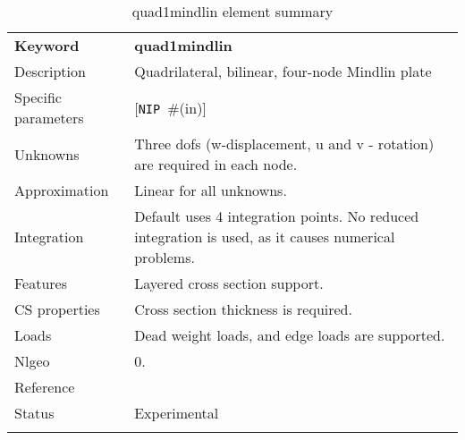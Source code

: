\documentclass[a4paper]{article}
\newcommand{\param}[1]{\texttt{#1}} %
\newcommand{\optional}[1]{[#1]} %
\newcommand{\field}[2]{\param{#1}~\#{\tiny(#2)}} %
\newcommand{\optField}[2]{\optional{\field{#1}{#2}}}
\newcommand{\templabel}{}%
\newcommand{\tempcaption}{}%
\newcounter{nelpar}
\newenvironment{elementsummary}[5]{%
  \gdef\tempcaption{#4}%
  \gdef\templabel{#5}%
  \setcounter{nelpar}{0}%
  \begin{center} %
    \begin{table}[!htb] %
      \begin{tabular}{|l|p{9cm}|}\hline %
        {\bf Keyword} & \bf{#1}\\ %
        {Description} & {#2}\\ %
        {Specific parameters} & {#3}\\ \hline %
}{
  \\ \hline %
      \end{tabular}%
      \caption{\tempcaption}%
      \label{\templabel}%
    \end{table}%
  \end{center}%
}
\newcommand{\elementParam}[1]{%
  \ifthenelse{\value{nelpar}>0} %
             {&{#1}}%
             {\setcounter{nelpar}{1}Parameters&{#1}}%
             \\%
}
\newcommand{\elementDescription}[2]{{#1} & {#2}\\ }
\begin{document}
\begin{elementsummary}{quad1mindlin}{Quadrilateral, bilinear, four-node Mindlin plate}{\optField{NIP}{in}}{quad1mindlin element summary}{quad1mindlinsummary}
\elementDescription{Unknowns}{Three dofs (w-displacement, u and v - rotation) are required in each node.}
\elementDescription{Approximation}{Linear for all unknowns.}
\elementDescription{Integration}{Default uses 4 integration points. No reduced integration is used, as it causes numerical problems.}
\elementDescription{Features}{Layered cross section support.}
\elementDescription{CS properties}{Cross section thickness is required.}
\elementDescription{Loads}{Dead weight loads, and edge loads are supported.}
\elementDescription{Nlgeo}{0.}
\elementDescription{Reference}{\cite{RobertCook1989}}
\elementDescription{Status}{Experimental}
\end{elementsummary}



\clearpage
\end{document}
